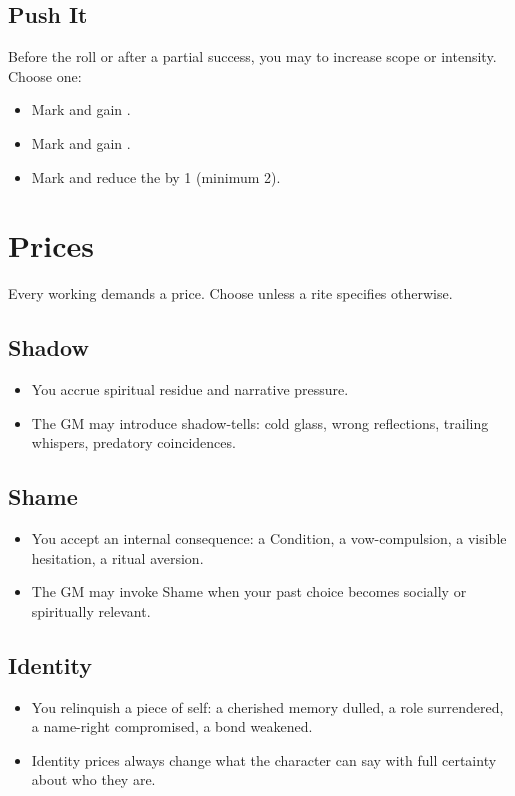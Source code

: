 \subsection{Push It}
Before the roll or after a partial success, you may  to increase scope or intensity.
Choose one:
\begin{itemize}
  \item Mark  and gain .
  \item Mark  and gain .
  \item Mark  and reduce the \DV{} by 1 (minimum 2).
\end{itemize}

\section{Prices}
Every working demands a price. Choose  unless a rite specifies otherwise.

\subsection{Shadow}
\begin{itemize}
  \item You accrue spiritual residue and narrative pressure.
  \item The GM may introduce shadow-tells: cold glass, wrong reflections, trailing whispers, predatory coincidences.
\end{itemize}

\subsection{Shame}
\begin{itemize}
  \item You accept an internal consequence: a Condition, a vow-compulsion, a visible hesitation, a ritual aversion.
  \item The GM may invoke Shame when your past choice becomes socially or spiritually relevant.
\end{itemize}

\subsection{Identity}
\begin{itemize}
  \item You relinquish a piece of self: a cherished memory dulled, a role surrendered, a name-right compromised, a bond weakened.
  \item Identity prices always change what the character can say with full certainty about who they are.
\end{itemize}

